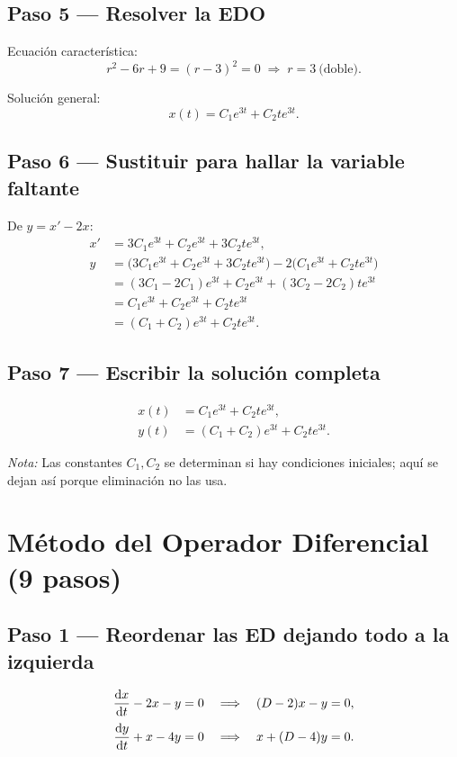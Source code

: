 \documentclass[10pt,a4paper]{article}
\begin{document}
\subsection{Paso 5 --- Resolver la EDO}

Ecuación característica:
\[
r^{2} - 6r + 9 = (r - 3)^{2} = 0 \;\Longrightarrow\; r = 3\ \text{(doble)}.
\]

Solución general:
\[
x(t) = C_{1} e^{3t} + C_{2} t e^{3t}.
\]

\subsection{Paso 6 --- Sustituir para hallar la variable faltante}

De \(y = x' - 2x\):
\[
\begin{aligned}
x' &= 3C_{1} e^{3t} + C_{2} e^{3t} + 3C_{2} t e^{3t},\\[2pt]
y  &= \bigl(3C_{1} e^{3t} + C_{2} e^{3t} + 3C_{2} t e^{3t}\bigr)
      - 2\bigl(C_{1} e^{3t} + C_{2} t e^{3t}\bigr) \\[2pt]
   &= (3C_{1} - 2C_{1}) e^{3t} + C_{2} e^{3t} + (3C_{2} - 2C_{2}) t e^{3t} \\[2pt]
   &= C_{1} e^{3t} + C_{2} e^{3t} + C_{2} t e^{3t} \\[2pt]
   &= (C_{1} + C_{2}) e^{3t} + C_{2} t e^{3t}.
\end{aligned}
\]

\subsection{Paso 7 --- Escribir la solución completa}
\[
\boxed{
\begin{aligned}
x(t) &= C_{1} e^{3t} + C_{2} t e^{3t},\\[2pt]
y(t) &= (C_{1} + C_{2}) e^{3t} + C_{2} t e^{3t}.
\end{aligned}
}
\]

\smallskip
\noindent\textit{Nota:} Las constantes \(C_{1}, C_{2}\) se determinan si hay condiciones iniciales; aquí se dejan así porque eliminación no las usa.

\section{Método del Operador Diferencial (9 pasos)}

\subsection{Paso 1 --- Reordenar las ED dejando todo a la izquierda}
\[
\begin{aligned}
\dv{x}{t} - 2x - y &= 0 \quad\Longrightarrow\quad (D - 2)x - y = 0,\\[2pt]
\dv{y}{t} + x - 4y &= 0 \quad\Longrightarrow\quad x + (D - 4)y = 0.
\end{aligned}
\]
\end{document}
